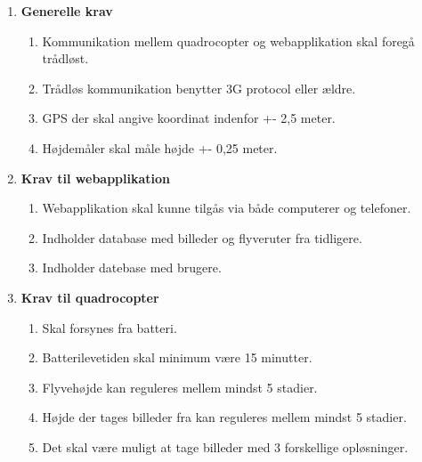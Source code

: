 \begin{enumerate}
\item \textbf{Generelle krav}
	\begin{enumerate}[label*=\arabic*.]
	\item Kommunikation mellem quadrocopter og webapplikation skal foregå trådløst.
	\item Trådløs kommunikation benytter 3G protocol eller ældre. 
	\item GPS der skal angive koordinat indenfor +- 2,5 meter.
	\item Højdemåler skal måle højde +- 0,25 meter.\\
	\end{enumerate}

\item \textbf{Krav til webapplikation}
	\begin{enumerate}[label*=\arabic*.]
	\item Webapplikation skal kunne tilgås via både computerer og telefoner.
	\item Indholder database med billeder og flyveruter fra tidligere.
	\item Indholder datebase med brugere.\\
	\end{enumerate}	
	

\item \textbf{Krav til quadrocopter}
	\begin{enumerate}[label*=\arabic*.]
	\item Skal forsynes fra batteri.
	\item Batterilevetiden skal minimum være 15 minutter.
	\item Flyvehøjde kan reguleres mellem mindst 5 stadier.
	\item Højde der tages billeder fra kan reguleres mellem mindst 5 stadier.
	\item Det skal være muligt at tage billeder med 3 forskellige opløsninger.\\
	\end{enumerate}
\end{enumerate}